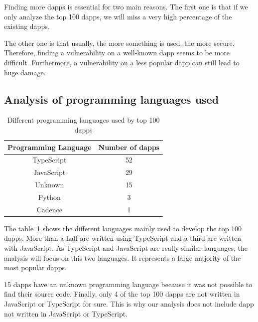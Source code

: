 \documentclass{iitFirstPage}
\begin{document}
    Finding more \Glspl{dapp} is essential for two main reasons.
    The first one is that if we only analyze the top 100 \Glspl{dapp}, we will miss a very high percentage of the existing \Glspl{dapp}.

    The other one is that usually, the more something is used, the more secure.
    Therefore, finding a vulnerability on a well-known \Gls{dapp} seems to be more difficult.
    Furthermore, a vulnerability on a less popular \Gls{dapp} can still lead to huge damage.

    \subsection{Analysis of programming languages used}

    \begin{table}[H]
        \begin{center}
            \begin{tabular}{|c|c|}
                \hline
                \textbf{Programming Language}   & \textbf{Number of \Glspl{dapp}}\\
                \hline
                \hline
                TypeScript   & 52                        \\
                \hline
                JavaScript    & 29                          \\
                \hline
                Unknown & 15                              \\
                \hline
                Python & 3                                \\
                \hline
                Cadence & 1                               \\
                \hline
            \end{tabular}
        \end{center}
        \caption{Different programming languages used by top 100 \Glspl{dapp}}
        \label{tab:program-lang}
    \end{table}

    The table~\ref{tab:program-lang} shows the different languages mainly used to develop the top 100 \Glspl{dapp}.
    More than a half are written using TypeScript and a third are written with JavaScript.
    As TypeScript and JavaScript are really similar languages, the analysis will focus on this two languages.
    It represents a large majority of the most popular \Glspl{dapp}.

    15 \Glspl{dapp} have an unknown programming language because it was not possible to find their source code.
    Finally, only 4 of the top 100 \Glspl{dapp} are not written in JavaScript or TypeScript for sure.
    This is why our analysis does not include \Gls{dapp} not written in JavaScript or TypeScript.
\end{document}
